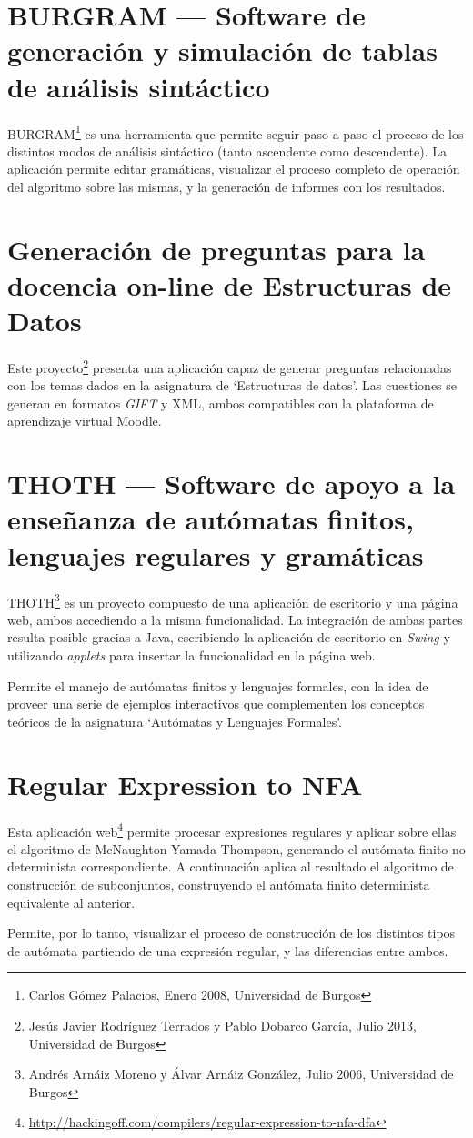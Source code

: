 
\section{BURGRAM --- Software de generación y simulación de tablas de análisis sintáctico}
BURGRAM\footnote{Carlos Gómez Palacios, Enero 2008, Universidad de Burgos} es una herramienta que permite seguir paso a paso el proceso de los distintos modos de análisis sintáctico (tanto ascendente como descendente).
La aplicación permite editar gramáticas, visualizar el proceso completo de operación del algoritmo sobre las mismas, y la generación de informes con los resultados.

\section{Generación de preguntas para la docencia on-line de Estructuras de Datos}
Este proyecto\footnote{Jesús Javier Rodríguez Terrados y Pablo Dobarco García, Julio 2013, Universidad de Burgos} presenta una aplicación capaz de generar preguntas relacionadas con los temas dados en la asignatura de `Estructuras de datos'.
Las cuestiones se generan en formatos \emph{GIFT} y XML, ambos compatibles con la plataforma de aprendizaje virtual Moodle.

\section{THOTH --- Software de apoyo a la enseñanza de autómatas finitos, lenguajes regulares y gramáticas}
THOTH\footnote{Andrés Arnáiz Moreno y Álvar Arnáiz González, Julio 2006, Universidad de Burgos} es un proyecto compuesto de una aplicación de escritorio y una página web, ambos accediendo a la misma funcionalidad.
La integración de ambas partes resulta posible gracias a Java, escribiendo la aplicación de escritorio en \emph{Swing} y utilizando \emph{applets} para insertar la funcionalidad en la página web.

Permite el manejo de autómatas finitos y lenguajes formales, con la idea de proveer una serie de ejemplos interactivos que complementen los conceptos teóricos de la asignatura `Autómatas y Lenguajes Formales'.

\section{Regular Expression to NFA}
Esta aplicación web\footnote{\url{http://hackingoff.com/compilers/regular-expression-to-nfa-dfa}} permite procesar expresiones regulares y aplicar sobre ellas el algoritmo de McNaughton-Yamada-Thompson, generando el autómata finito no determinista correspondiente.
A continuación aplica al resultado el algoritmo de construcción de subconjuntos, construyendo el autómata finito determinista equivalente al anterior.

Permite, por lo tanto, visualizar el proceso de construcción de los distintos tipos de autómata partiendo de una expresión regular, y las diferencias entre ambos.